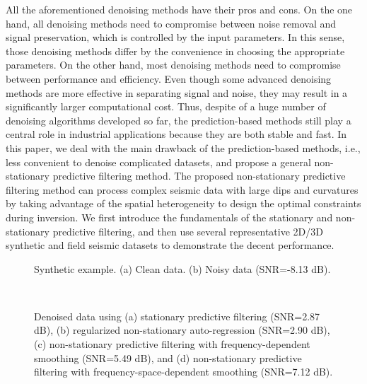  All the aforementioned denoising methods have their pros and cons. On the one hand, all denoising methods need to compromise between noise removal and signal preservation, which is controlled by the input parameters. In this sense, those denoising methods differ by the convenience in choosing the appropriate parameters. On the other hand, most denoising methods need to compromise between performance and efficiency. Even though some advanced denoising methods are more effective in separating signal and noise, they may result in a significantly larger computational cost. Thus, despite of a huge number of denoising algorithms developed so far, the prediction-based methods still play a central role in industrial applications because they are both stable and fast. In this paper, we deal with the main drawback of the prediction-based methods, i.e., less convenient to denoise complicated datasets, and propose a general non-stationary predictive filtering method. The proposed non-stationary predictive filtering method can process complex seismic data with large dips and curvatures by taking advantage of the spatial heterogeneity to design the optimal constraints during inversion. We first introduce the fundamentals of the stationary and non-stationary predictive filtering, and then use several representative 2D/3D synthetic and field seismic datasets to demonstrate the decent performance. 

\begin{figure}[htb!]
\centering
{}
\caption{Synthetic example. (a) Clean data. (b) Noisy data (SNR=-8.13 dB).}
\label{fig:cmp0,cmp}
\end{figure}

\begin{figure}[htb!]
\centering
{}
\\
\caption{Denoised data using (a) stationary predictive filtering (SNR=2.87 dB), (b) regularized non-stationary auto-regression (SNR=2.90 dB), (c) non-stationary predictive filtering with frequency-dependent smoothing (SNR=5.49 dB), and (d) non-stationary predictive filtering with frequency-space-dependent smoothing (SNR=7.12 dB).}
\label{fig:test2-0,test1-0,test00-0,test3-0}
\end{figure}

